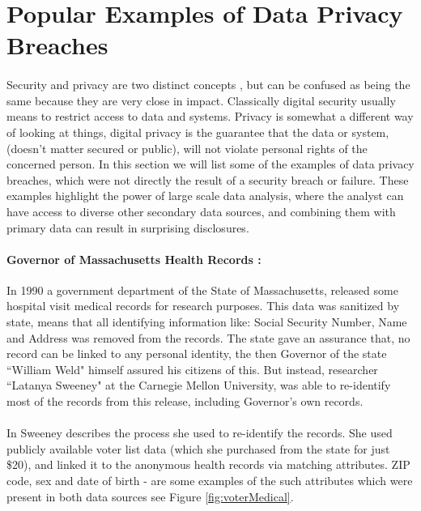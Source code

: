 \documentclass[12pt]{report}
\theoremstyle{named}
\begin{document}
\section{Popular Examples of Data Privacy Breaches}
\paragraph{}
Security and privacy are two distinct concepts \cite{spencer2001security}, but can be confused as being the same because they are very close in impact. Classically digital security usually means to restrict access to data and systems. Privacy is somewhat a different way of looking at things, digital privacy is the guarantee that the data or system, (doesn't matter secured or public), will not violate personal rights of the concerned person. In this section we will list some of the examples of data privacy breaches, which were not directly the result of a security breach or failure. These examples highlight the power of large scale data analysis, where the analyst can have access to diverse other secondary data sources, and combining them with primary data can result in surprising disclosures.
\paragraph{Governor of Massachusetts Health Records \cite{sweeney2000uniqueness}:\\}
In 1990 a government department of the State of Massachusetts, released some hospital visit medical records for research purposes. This data was sanitized by state, means that all identifying information like: Social Security Number, Name and Address was removed from the records. The state gave an assurance that, no record can be linked to any personal identity, the then Governor of the state ``William Weld" himself assured his citizens of this. But instead, researcher ``Latanya Sweeney" at the Carnegie Mellon University, was able to re-identify most of the records from this release, including Governor's own records. 
\paragraph{}
In \cite{sweeney2000uniqueness} Sweeney describes the process she used to re-identify the records. She used publicly available voter list data (which she purchased from the state for just \$20), and linked it to the anonymous health records via matching attributes. ZIP code, sex and  date of birth - are some examples of the such attributes which were present in both data sources see Figure \ref{fig:voterMedical}.
\end{document}
